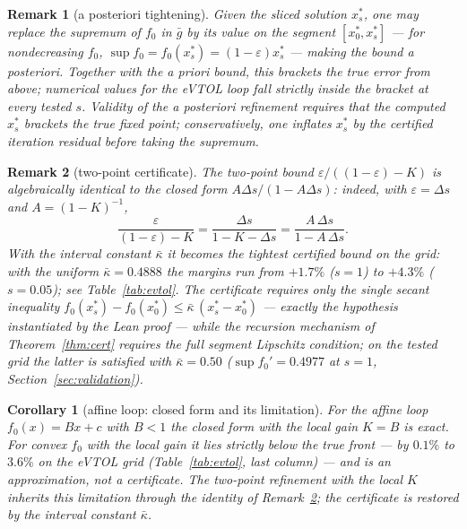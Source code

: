\documentclass[11pt]{article}
\newtheorem{corollary}{Corollary}[section]
\newtheorem{remark}{Remark}[section]
\numberwithin{equation}{section}
\begin{document}
\begin{remark}[a posteriori tightening]\label{rem:apost}
Given the sliced solution $x_s^*$, one may replace the supremum of $f_0$ in
$\bar g$ by its value on the segment $[x_0^*,x_s^*]$ --- for nondecreasing
$f_0$, $\sup f_0=f_0(x_s^*)=(1-\varepsilon)x_s^*$ --- making the bound
a posteriori. Together with the a priori bound, this brackets the true error
from above; numerical values for the eVTOL loop fall strictly inside the
bracket at every tested $s$. Validity of the a posteriori refinement requires
that the computed $x_s^*$ brackets the true fixed point; conservatively, one
inflates $x_s^*$ by the certified iteration residual before taking the
supremum.
\end{remark}

\begin{remark}[two-point certificate]\label{rem:twopoint}
The two-point bound $\varepsilon/((1-\varepsilon)-K)$ is algebraically
identical to the closed form $A\Delta s/(1-A\Delta s)$: indeed, with
$\varepsilon=\Delta s$ and $A=(1-K)^{-1}$,
\[
\frac{\varepsilon}{(1-\varepsilon)-K}
=\frac{\Delta s}{1-K-\Delta s}
=\frac{A\,\Delta s}{1-A\,\Delta s}.
\]
With the interval constant $\bar\kappa$ it becomes the tightest certified
bound on the grid: with the uniform $\bar\kappa=0.4888$ the margins run from
$+1.7\%$ ($s=1$) to $+4.3\%$ ($s=0.05$); see Table~\ref{tab:evtol}. The
certificate requires only the single secant inequality
$f_0(x_s^*)-f_0(x_0^*)\le\bar\kappa\,(x_s^*-x_0^*)$ --- exactly the hypothesis
instantiated by the Lean proof --- while the recursion mechanism of
Theorem~\ref{thm:cert} requires the full segment Lipschitz condition; on the
tested grid the latter is satisfied with $\bar\kappa=0.50$
($\sup f_0'=0.4977$ at $s=1$, Section~\ref{sec:validation}).
\end{remark}

\begin{corollary}[affine loop: closed form and its limitation]\label{cor:affine}
For the affine loop $f_0(x)=Bx+c$ with $B<1$ the closed form with the local
gain $K=B$ is exact. For convex $f_0$ with the local gain it lies strictly
below the true front --- by $0.1\%$ to $3.6\%$ on the eVTOL grid
(Table~\ref{tab:evtol}, last column) --- and is an approximation, not a
certificate. The two-point refinement with the local $K$ inherits this
limitation through the identity of Remark~\ref{rem:twopoint}; the certificate
is restored by the interval constant $\bar\kappa$.
\end{corollary}
\end{document}

